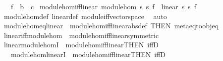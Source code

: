 \begin{isabellebody}
\ \ \ f\ {\isacharcolon}{\kern0pt}{\isacharcolon}{\kern0pt}\ {\isachardoublequoteopen}{\isacharprime}{\kern0pt}b\ {\isasymRightarrow}\ {\isacharprime}{\kern0pt}c{\isachardoublequoteclose}\isanewline
\isanewline
{}\isamarkupfalse%
\ module{\isacharunderscore}{\kern0pt}hom{\isacharunderscore}{\kern0pt}iff{\isacharunderscore}{\kern0pt}linear{\isacharcolon}{\kern0pt}\ {\isachardoublequoteopen}module{\isacharunderscore}{\kern0pt}hom\ s{}\ s{}\ f\ {\isasymlongleftrightarrow}\ linear\ s{}\ s{}\ f{\isachardoublequoteclose}\isanewline
%
\isadelimproof
\ \ %
\endisadelimproof
%
\isatagproof
{}\isamarkupfalse%
\ module{\isacharunderscore}{\kern0pt}hom{\isacharunderscore}{\kern0pt}def\ linear{\isacharunderscore}{\kern0pt}def\ module{\isacharunderscore}{\kern0pt}iff{\isacharunderscore}{\kern0pt}vector{\isacharunderscore}{\kern0pt}space\ \isamarkupfalse%
\ auto%
\endisatagproof
{\isafoldproof}%
%
\isadelimproof
\isanewline
%
\endisadelimproof
{}\isamarkupfalse%
\ module{\isacharunderscore}{\kern0pt}hom{\isacharunderscore}{\kern0pt}eq{\isacharunderscore}{\kern0pt}linear\ {\isacharequal}{\kern0pt}\ module{\isacharunderscore}{\kern0pt}hom{\isacharunderscore}{\kern0pt}iff{\isacharunderscore}{\kern0pt}linear{\isacharbrackleft}{\kern0pt}abs{\isacharunderscore}{\kern0pt}def{\isacharcomma}{\kern0pt}\ THEN\ meta{\isacharunderscore}{\kern0pt}eq{\isacharunderscore}{\kern0pt}to{\isacharunderscore}{\kern0pt}obj{\isacharunderscore}{\kern0pt}eq{\isacharbrackright}{\kern0pt}\isanewline
{}\isamarkupfalse%
\ linear{\isacharunderscore}{\kern0pt}iff{\isacharunderscore}{\kern0pt}module{\isacharunderscore}{\kern0pt}hom\ {\isacharequal}{\kern0pt}\ module{\isacharunderscore}{\kern0pt}hom{\isacharunderscore}{\kern0pt}iff{\isacharunderscore}{\kern0pt}linear{\isacharbrackleft}{\kern0pt}symmetric{\isacharbrackright}{\kern0pt}\isanewline
{}\isamarkupfalse%
\ linear{\isacharunderscore}{\kern0pt}module{\isacharunderscore}{\kern0pt}homI\ {\isacharequal}{\kern0pt}\ module{\isacharunderscore}{\kern0pt}hom{\isacharunderscore}{\kern0pt}iff{\isacharunderscore}{\kern0pt}linear{\isacharbrackleft}{\kern0pt}THEN\ iffD{}{\isacharbrackright}{\kern0pt}\isanewline
\ \ \ module{\isacharunderscore}{\kern0pt}hom{\isacharunderscore}{\kern0pt}linearI\ {\isacharequal}{\kern0pt}\ module{\isacharunderscore}{\kern0pt}hom{\isacharunderscore}{\kern0pt}iff{\isacharunderscore}{\kern0pt}linear{\isacharbrackleft}{\kern0pt}THEN\ iffD{}{\isacharbrackright}{\kern0pt}\isanewline

\end{isabellebody}
